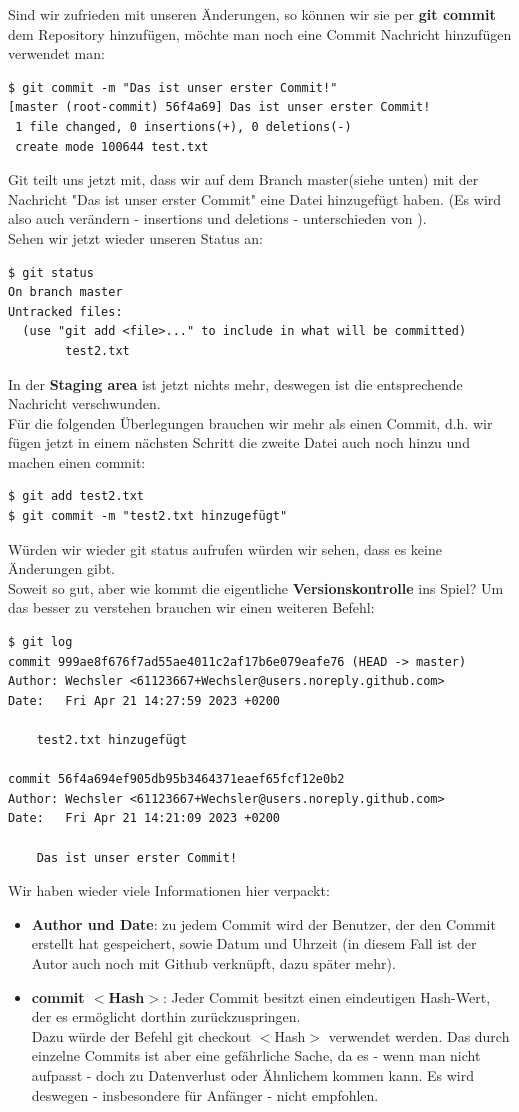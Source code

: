 \documentclass{article}
\begin{document}
Sind wir zufrieden mit unseren Änderungen, so können wir sie per \textbf{git commit} dem Repository hinzufügen, möchte man noch eine Commit Nachricht hinzufügen verwendet man:
\begin{verbatim}
$ git commit -m "Das ist unser erster Commit!"
[master (root-commit) 56f4a69] Das ist unser erster Commit!
 1 file changed, 0 insertions(+), 0 deletions(-)
 create mode 100644 test.txt
\end{verbatim}
Git teilt uns jetzt mit, dass wir auf dem Branch master(siehe unten) mit der Nachricht "Das ist unser erster Commit" eine Datei hinzugefügt haben. (Es wird also auch verändern - insertions und deletions - unterschieden von ). \\
Sehen wir jetzt wieder unseren Status an:
\begin{verbatim}
$ git status
On branch master
Untracked files:
  (use "git add <file>..." to include in what will be committed)
        test2.txt
\end{verbatim}
In der \textbf{Staging area} ist jetzt nichts mehr, deswegen ist die entsprechende Nachricht verschwunden. \\
Für die folgenden Überlegungen brauchen wir mehr als einen Commit, d.h. wir fügen jetzt in einem nächsten Schritt die zweite Datei auch noch hinzu und machen einen commit: 
\begin{verbatim}
$ git add test2.txt 
$ git commit -m "test2.txt hinzugefügt"
\end{verbatim}
Würden wir wieder git status aufrufen würden wir sehen, dass es keine Änderungen gibt. \\
Soweit so gut, aber wie kommt die eigentliche \textbf{Versionskontrolle} ins Spiel? Um das besser zu verstehen brauchen wir einen weiteren Befehl:
\begin{verbatim}
$ git log
commit 999ae8f676f7ad55ae4011c2af17b6e079eafe76 (HEAD -> master)
Author: Wechsler <61123667+Wechsler@users.noreply.github.com>
Date:   Fri Apr 21 14:27:59 2023 +0200

    test2.txt hinzugefügt

commit 56f4a694ef905db95b3464371eaef65fcf12e0b2
Author: Wechsler <61123667+Wechsler@users.noreply.github.com>
Date:   Fri Apr 21 14:21:09 2023 +0200

    Das ist unser erster Commit!
\end{verbatim}
Wir haben wieder viele Informationen hier verpackt:
\begin{itemize}
    \item \textbf{Author und Date}: zu jedem Commit wird der Benutzer, der den Commit erstellt hat gespeichert, sowie Datum und Uhrzeit (in diesem Fall ist der Autor auch noch mit Github verknüpft, dazu später mehr).
    \item \textbf{commit $<$Hash$>$}: Jeder Commit besitzt einen eindeutigen Hash-Wert, der es ermöglicht dorthin zurückzuspringen. \\
    Dazu würde der Befehl git checkout $<$Hash$>$ verwendet werden. Das  durch einzelne Commits ist aber eine gefährliche Sache, da es - wenn man nicht aufpasst - doch zu Datenverlust oder Ähnlichem kommen kann. Es wird deswegen - insbesondere für Anfänger - nicht empfohlen.
\end{itemize}
\end{document}

